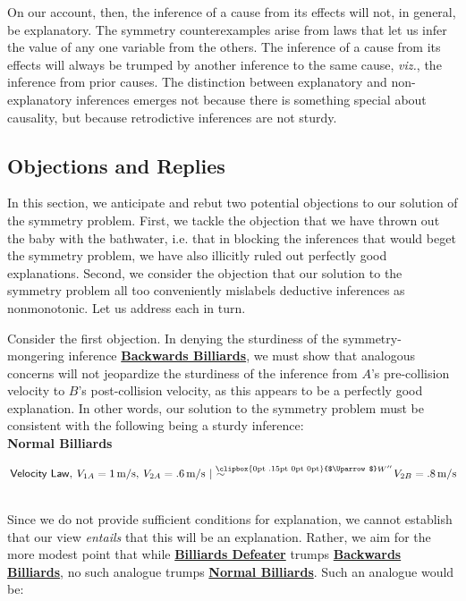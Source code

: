 \documentclass{article}                     %
\makeatletter
\newcommand{\Uuparrow}{%
	\raisebox{.2ex}{\clipbox{0pt .15pt 0pt 0pt}{$\Uparrow$}}
}
\newcommand{\nms}{%
	\mathbin{\mathpalette\@nms\expandafter}
}
\newcommand{\@nms}{\mid\joinrel\mkern-.5mu\sim}
\newcommand{\mrc}[1]{\mathbin{
		\mathchoice
		{\normalsize\hspace{.5mm}\nms^{\mkern-19mu\scriptsize\Uuparrow#1}\hspace{-.5mm}}
		{\normalsize\hspace{.5mm}\nms^{\mkern-19mu\scriptsize\Uuparrow#1}\hspace{-.5mm}}
		{\footnotesize\hspace{.5mm}\nms^{\mkern-13.5mu\fontsize{5.5}{0}\Uuparrow#1}}
		{\scriptsize\nms^{\mkern-10mu\tiny\Uuparrow#1}}
	}
}
\makeatother
\begin{document}
On our account, then, the inference of a cause from its effects will not, in general, be explanatory.  The symmetry counterexamples arise from laws that let us infer the value of any one variable from the others. The inference of a cause from its effects will always be trumped by another inference to the same cause, \textit{viz.}, the inference from prior causes. The distinction between explanatory and non-explanatory inferences emerges not because there is something special about causality, but because retrodictive inferences are not sturdy.

\subsection{Objections and Replies}
\label{subsec:objections}
In this section, we anticipate and rebut two potential objections to our solution of the symmetry problem. First, we tackle the objection that we have thrown out the baby with the bathwater, i.e. that in blocking the inferences that would beget the symmetry problem, we have also illicitly ruled out perfectly good explanations. Second, we consider the objection that our solution to the symmetry problem all too conveniently mislabels deductive inferences as nonmonotonic. Let us address each in turn.

Consider the first objection. In denying the sturdiness of the symmetry-mongering inference \hyperref[eq:MRC_ballsbackwards]{\textbf{Backwards Billiards}}, we must show that analogous concerns will not jeopardize the sturdiness of the inference from $A$'s pre-collision velocity to $B$'s post-collision velocity, as this appears to be a perfectly good explanation. In other words, our solution to the symmetry problem must be consistent with the following being a sturdy inference:\\ 

\noindent \label{eq:MRC_ballsforward}\textbf{Normal Billiards}\hspace{8mm}\begin{minipage}[t]{.8\textwidth}
	$\hspace{.5ex}\mathsf{Velocity\ Law},\hspace{.5ex} V_{1A} = 1\,\text{m/s},\hspace{.5ex} V_{2A} = .6\,\text{m/s} \mrc{W''} V_{2B} = .8\,\text{m/s}$
\end{minipage}\\ 

Since we do not provide sufficient conditions for explanation, we cannot establish that our view \textit{entails} that this will be an explanation. Rather, we aim for the more modest point that while \hyperref[eq:MRC_defeater]{\textbf{Billiards Defeater}} trumps \hyperref[eq:MRC_ballsbackwards]{\textbf{Backwards Billiards}}, no such analogue trumps \hyperref[eq:MRC_ballsforward]{\textbf{Normal Billiards}}. Such an analogue would be:\\
\end{document}
